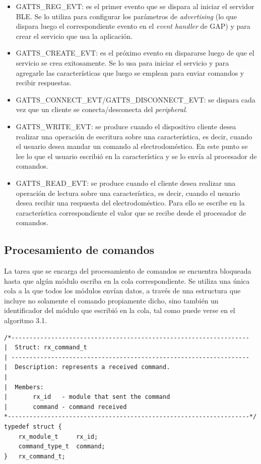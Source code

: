 \begin{itemize}
	\item GATTS\_REG\_EVT: es el primer evento que se dispara al iniciar el servidor BLE. Se lo utiliza para configurar los parámetros de \emph{advertising} (lo que dispara luego el correspondiente evento en el \emph{event handler} de GAP) y para crear el servicio que usa la aplicación.
	\item GATTS\_CREATE\_EVT: es el próximo evento en dispararse luego de que el servicio se crea exitosamente. Se lo usa para iniciar el servicio y para agregarle las características que luego se emplean para enviar comandos y recibir respuestas.
	\item GATTS\_CONNECT\_EVT/GATTS\_DISCONNECT\_EVT: se dispara cada vez que un cliente se conecta/desconecta del \emph{peripheral}.
	\item GATTS\_WRITE\_EVT: se produce cuando el dispositivo cliente desea realizar una operación de escritura sobre una característica, es decir, cuando el usuario desea mandar un comando al electrodoméstico. En este punto se lee lo que el usuario escribió en la característica y se lo envía al procesador de comandos.
	\item GATTS\_READ\_EVT: se produce cuando el cliente desea realizar una operación de lectura sobre una característica, es decir, cuando el usuario desea recibir una respuesta del electrodoméstico. Para ello se escribe en la característica correspondiente el valor que se recibe desde el procesador de comandos.
\end{itemize}


\subsection{Procesamiento de comandos}

La tarea que se encarga del procesamiento de comandos se encuentra bloqueada hasta que algún módulo escriba en la cola correspondiente. Se utiliza una única cola a la que todos los módulos envían datos, a través de una estructura que incluye no solamente el comando propiamente dicho, sino también un identificador del módulo que escribió en la cola, tal como puede verse en el algoritmo 3.1.

\begin{lstlisting}[label=rx_command_struct:vControl,caption=Pseudocódigo del lazo principal de control.]
/*------------------------------------------------------------------
|  Struct: rx_command_t
| ------------------------------------------------------------------
|  Description: represents a received command.
|
|  Members:
|       rx_id   - module that sent the command
|       command - command received
*-------------------------------------------------------------------*/
typedef struct {
    rx_module_t     rx_id;
    command_type_t  command; 
}   rx_command_t;
\end{lstlisting}

